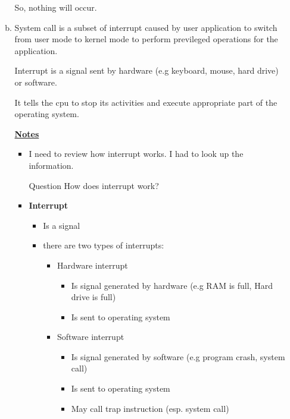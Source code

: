 \documentclass[12pt]{article}
\begin{document}
\begin{enumerate}[1.]
\begin{enumerate}[a)]
        So, nothing will occur.

        \bigskip

        \item

        System call is a subset of interrupt caused by user application to switch
        from user mode to kernel mode to perform previleged operations for the application.

        \bigskip

        Interrupt is a signal sent by hardware (e.g keyboard, mouse, hard drive) or software.

        \bigskip

        It tells the cpu to stop its activities and execute appropriate part of the operating system.

        \bigskip

        \underline{\textbf{Notes}}

        \begin{itemize}
            \item I need to review how interrupt works. I had to look up the information.
            \item [\color{blue}Question\color{black}] How does interrupt work?
            \item \textbf{Interrupt}

            \begin{itemize}
                \item Is a signal
                \item there are two types of interrupts:
                \begin{itemize}
                    \item Hardware interrupt
                    \begin{itemize}
                        \item Is signal generated by hardware (e.g RAM is full, Hard drive is full)
                        \item Is sent to operating system
                    \end{itemize}
                    \item Software interrupt
                    \begin{itemize}
                        \item Is signal generated by software (e.g program crash, system call)
                        \item Is sent to operating system
                        \item May call trap instruction (esp. system call)
                    \end{itemize}
                \end{itemize}
            \end{itemize}


\end{itemize}
\end{enumerate}
\end{enumerate}
\end{document}
